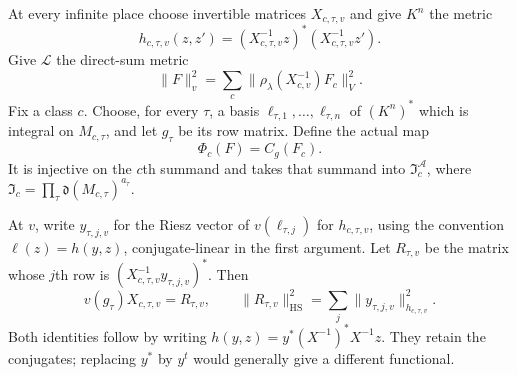 At every infinite place choose invertible matrices $X_{c,\tau,v}$ and
give $K^n$ the metric
\[
       h_{c,\tau,v}(z,z')=(X_{c,\tau,v}^{-1}z)^*
                                      (X_{c,\tau,v}^{-1}z').
\]
Give $\mathcal L$ the direct-sum metric
\begin{equation}\label{am-class-metric}
       \|F\|_v^2=\sum_c
             \|\rho_\lambda(X_{c,v}^{-1})F_c\|_V^2.
\end{equation}
Fix a class $c$. Choose, for every $\tau$, a basis
$\ell_{\tau,1},\ldots,\ell_{\tau,n}$ of $(K^n)^*$ which is integral
on $M_{c,\tau}$, and let $g_\tau$ be its row matrix.
Define the actual map
\[
                     \Phi_c(F)=C_g(F_c).
\]
It is injective on the $c$th summand and takes that summand into
$\mathfrak I_c^{\mathcal A}$, where
$\mathfrak I_c=\prod_\tau\mathfrak d(M_{c,\tau})^{a_\tau}$.

At $v$, write $y_{\tau,j,v}$ for the Riesz vector of
$v(\ell_{\tau,j})$ for $h_{c,\tau,v}$, using the convention
$\ell(z)=h(y,z)$, conjugate-linear in the first argument.
Let $R_{\tau,v}$ be the matrix whose $j$th row is
$(X_{c,\tau,v}^{-1}y_{\tau,j,v})^*$. Then
\begin{equation}\label{am-riesz}
       v(g_\tau)X_{c,\tau,v}=R_{\tau,v},\qquad
       \|R_{\tau,v}\|_{\mathrm{HS}}^2
                         =\sum_j\|y_{\tau,j,v}\|_{h_{c,\tau,v}}^2.
\end{equation}
Both identities follow by writing
$h(y,z)=y^*(X^{-1})^*X^{-1}z$.
They retain the conjugates; replacing $y^*$ by $y^t$ would generally
give a different functional.

